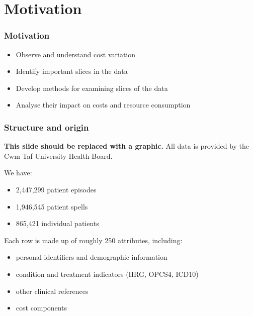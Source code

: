 \section{Motivation}

\begin{frame}
\frametitle{Motivation}

\begin{itemize}
    \item Observe and understand cost variation
    \item Identify important slices in the data
    \item Develop methods for examining slices of the data
    \item Analyse their impact on costs and resource consumption
\end{itemize}
\end{frame}


\begin{frame}
    \frametitle{Structure and origin}
    \textbf{This slide should be replaced with a graphic.}
    \pause%
    All data is provided by the Cwm Taf University Health Board.
    \vspace{10pt}

    \pause%
    We have:
    \begin{itemize}
        \item 2,447,299 patient episodes
        \item 1,946,545 patient spells
        \item 865,421 individual patients
    \end{itemize}
    \vspace{10pt}

    \pause%
    Each row is made up of roughly 250 attributes, including:
    \begin{itemize}
        \pause%
        \item personal identifiers and demographic information
        \pause%
        \item condition and treatment indicators (HRG, OPCS4, ICD10)
        \pause%
        \item other clinical references
        \pause%
        \item cost components
    \end{itemize}
\end{frame}
